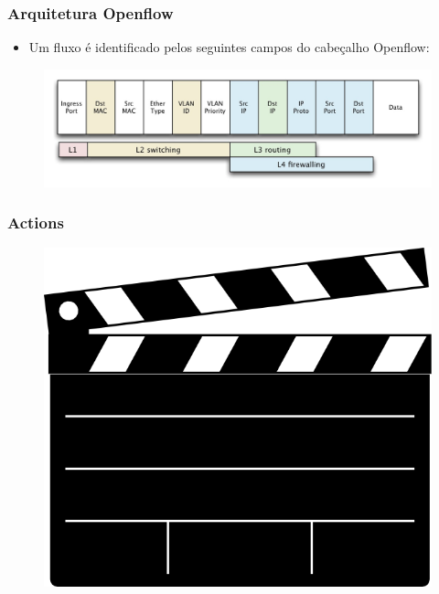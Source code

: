 %
%
\begin{frame}\frametitle{Arquitetura Openflow}

    \begin{itemize}
    \item Um fluxo é identificado pelos seguintes campos do cabeçalho 
          Openflow:
    \end{itemize}
	\begin{figure}[h]\hspace*{-1.2cm}
        \centering
        \includegraphics[scale=0.32]{images/openflow-header.jpg}
    \end{figure}
    
\end{frame}


%
%
\begin{frame}\frametitle{Actions}

	\begin{figure}[h]
        \centering
        \includegraphics[scale=0.5]{images/action.png}
    \end{figure}
    
\end{frame}


